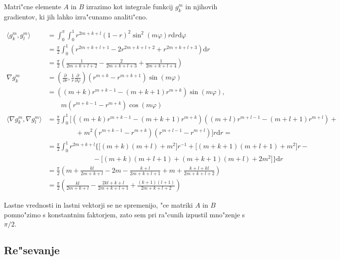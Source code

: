 \documentclass[a4paper,10pt]{article}
\renewcommand{\phi}{\varphi}
\newcommand{\dd}{\mathrm{d}}
\newcommand{\parcialno}[2]{
  \frac{\partial #1}{\partial #2}
}
\begin{document}
Matri"cne elemente $A$ in $B$ izrazimo kot integrale funkcij $g_{k}^{m}$ in njihovih gradientov, ki jih lahko izra"cunamo analiti"cno. 

\begin{align}
\langle g_{k}^{m}, g_{l}^{m} \rangle &= \int_0^\pi \int_0^1 r^{2m+k+l}(1-r)^2 \sin^2 (m\phi) r \dd r \dd \phi \nonumber \\
  &= \frac{\pi}{2} \int_0^1 \left( r^{2m+k+l+1} -2r^{2m+k+l+2} + r^{2m+k+l+3} \right) \dd r \nonumber \\
  &= \frac{\pi}{2} \left( \frac{1}{2m+k+l+2} - \frac{2}{2m+k+l+3} + \frac{1}{2m+k+l+4} \right) \\
  \nabla g_{k}^{m} &= \left( \parcialno{}{r}, \frac{1}{r} \parcialno{}{\phi} \right) \left( r^{m+k} - r^{m+k+1}\right) \sin(m\phi) \nonumber \\
  &= \left((m+k)r^{m+k-1} - (m+k+1)r^{m+k} \right)\sin(m\phi), \nonumber \\
  & {} \quad \quad m\left( r^{m+k-1} - r^{m+k}\right) \cos(m\phi) \\
  \langle \nabla g_{k}^{m}, \nabla g_{l}^{m} \rangle &= \frac{\pi}{2} \int_0^1 \Big[ \left((m+k)r^{m+k-1} - (m+k+1)r^{m+k} \right)\left((m+l)r^{m+l-1} - (m+l+1)r^{m+l} \right) + \nonumber \\
  & {} \hspace{50pt} + m^2 \left( r^{m+k-1} - r^{m+k}\right)\left( r^{m+l-1} - r^{m+l}\right) \Big] r \dd r = \nonumber \\
  &= \frac{\pi}{2} \int_0^1 r^{2m+k+l} \Big\{ \big[ (m+k)(m+l) + m^2 \big] r^{-1} + \big[ (m+k+1)(m+l+1) + m^2 \big]r - \nonumber \\ 
  & \hspace{80pt} - \big[ (m+k)(m+l+1) + (m+k+1)(m+l) + 2m^2 \big] \Big\} \dd r \nonumber \\
  &= \frac{\pi}{2} \left( m + \frac{kl}{2m+k+l} -2m - \frac{k + l}{2m+k+l+1} + m + \frac{k+l + kl}{2m+k+l+2} \right) \nonumber \\
  &= \frac{\pi}{2} \left( \frac{kl}{2m+k+l} - \frac{2kl + k + l}{2m+k+l+1} + \frac{(k+1)(l+1)}{2m+k+l+2} \right)
\end{align}

Lastne vrednosti in lastni vektorji se ne spremenijo, "ce matriki $A$ in $B$ pomno"zimo s konstantnim faktorjem, zato sem pri ra"cunih izpustil mno"zenje s $\pi/2$. 

\subsection{Re"sevanje}
\end{document}
